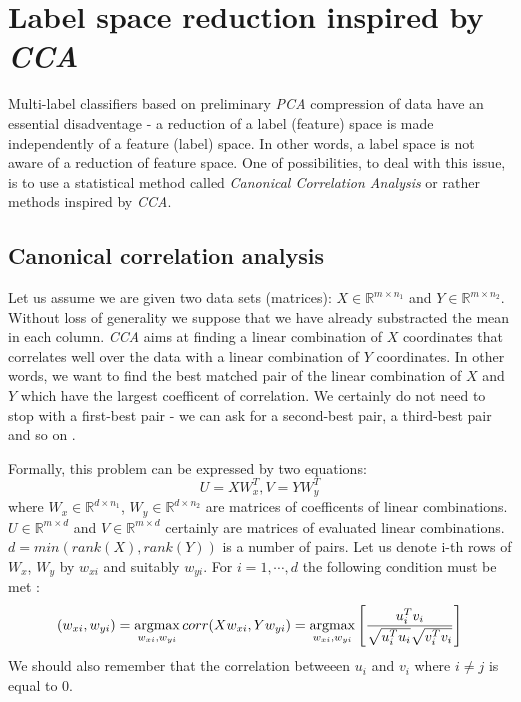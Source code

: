 \section{Label space reduction inspired by \textit{CCA}}

Multi-label classifiers based on preliminary \textit{PCA} compression of data have an essential disadventage - a reduction of a label (feature) space is made independently of a feature (label) space. In other words, a label space is not aware of a reduction of feature space. One of possibilities, to deal with this issue, is to use a statistical method called \textit{Canonical Correlation Analysis} or rather methods inspired by \textit{CCA}.   

\subsection{Canonical correlation analysis}

Let us assume we are given two data sets (matrices): $X \in \mathbb{R}^{m \times n_1}$ and $Y \in \mathbb{R}^{m \times n_2}$. Without loss of generality we suppose that we have already substracted the mean in each column. \textit{CCA} aims at finding a linear combination of $X$ coordinates that correlates well over the data with a linear combination of $Y$ coordinates. In other words, we want to find the best matched pair of the linear combination of $X$ and $Y$ which have the largest coefficent of correlation. We certainly do not need to stop with a first-best pair - we can ask for a second-best pair, a third-best pair and so on \cite{William}.

Formally, this problem can be expressed by two equations:
\begin{equation}\label{eq:cca1}
    U=XW_x^T,   V=YW_y^T    
\end{equation}
where $W_x \in \mathbb{R}^{d \times n_1}$, $W_y \in \mathbb{R}^{d \times n_2}$ are matrices of coefficents of linear combinations. $U \in \mathbb{R}^{m \times d}$ and $V \in \mathbb{R}^{m \times d}$ certainly are matrices of evaluated linear combinations. $d=min(rank(X), rank(Y))$ is a number of pairs. Let us denote i-th rows of $W_x$, $W_y$ by $w_{xi}$ and suitably $w_{yi}$. For $i=1,\cdots,d$ the following condition must be met \cite{William}:
\begin{equation}\label{eq:cca2}
    (w_{xi}, w_{yi})=\operatorname*{argmax}_{w_{xi}, w_{yi}} corr(Xw_{xi}, Yw_{yi}) = \operatorname*{argmax}_{w_{xi}, w_{yi}} \left[\frac{u^{T}_iv_i}{\sqrt{u^T_iu_i}\sqrt{v^{T}_iv_i}}\right] 
\end{equation}
We should also remember that the correlation betweeen $u_i$ and $v_i$ where $i\neq j$ is equal to $0$.

